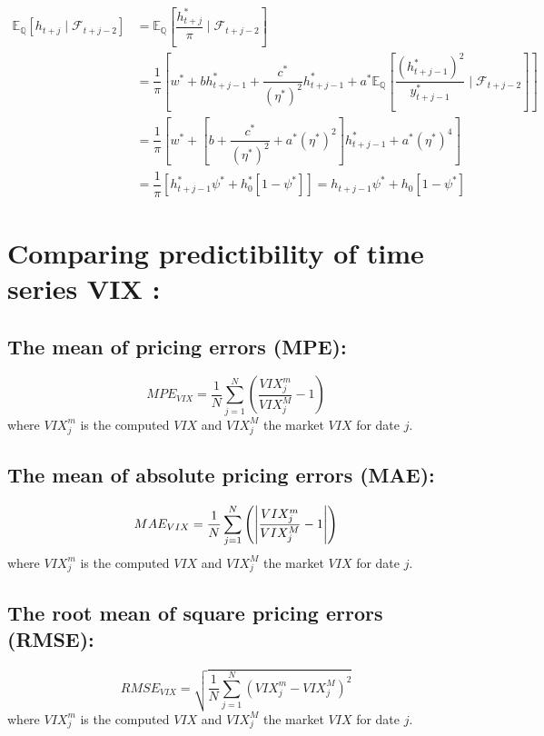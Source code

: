\documentclass[preprint,times,12pt]{elsarticle}
\DeclarePairedDelimiter\abs{\lvert}{\rvert}
\begin{document}
\begin{align*}
\mathbb{E}_\mathbb{Q}\left[ h_{t+j} \mid \mathcal{F}_{t+j-2}\right] &=\mathbb{E}_\mathbb{Q}\left[ \dfrac{h^{*}_{t+j}}{\pi} \mid \mathcal{F}_{t+j-2}\right]\\ 
 &=\dfrac{1}{\pi}\left[ w^{*} +b h^*_{t+j-1}+\dfrac{c^{*}}{(\eta^{*})^{2}} h^{*}_{t+j-1}+a^{*}\mathbb{E}_\mathbb{Q}\left[\dfrac{(h^*_{t+j-1})^{2}}{y^{*}_{t+j-1}} \mid \mathcal{F}_{t+j-2} \right]\right] \\
  &= \dfrac{1}{\pi}\left[w^{*} +\left[b +\dfrac{c^{*}}{\left( \eta^{*}\right) ^{2}} + a^{*}  \left(\eta^{*}\right)^{2}\right] h^{*}_{t+j-1} + a^{*} \left( \eta^{*}\right)^4\right] \\
  &= \dfrac{1}{\pi}\left[h^*_{t+j-1} \psi^{*}  + h^{*}_{0}\left[1-\psi^{*} \right]\right] = h_{t+j-1} \psi^{*}  + h_{0}\left[1-\psi^{*} \right] 
\end{align*}





\section{Comparing predictibility of time series VIX :}
\subsection{The mean of pricing errors (MPE):}
\begin{equation*}
MPE_{VIX}=\dfrac{1}{N}\sum^{N}_{j=1}\left(\dfrac{VIX^{m}_{j}}{VIX^{M}_{j}}-1\right) 
\end{equation*}
where $ VIX^{m}_{j} $ is the computed $ VIX $ and  $VIX^{M}_{j}$ the market $ VIX $ for date $ j $.

\subsection{The mean of absolute pricing errors (MAE):}
\begin{equation*}
MAE_{VIX}=\dfrac{1}{N}\sum^{N}_{j=1}\left(\abs*{\dfrac{VIX^{m}_{j}}{VIX^{M}_{j}}-1}\right) 
\end{equation*}
where $ VIX^{m}_{j} $ is the computed $ VIX $ and  $VIX^{M}_{j}$ the market $ VIX $ for date $ j $.
\subsection{The root mean of square pricing errors (RMSE):}
\begin{equation*}
RMSE_{VIX}=\sqrt{\dfrac{1}{N}\sum^{N}_{j=1}\left( VIX^{m}_{j}-VIX^{M}_{j} \right)^{2}} 
\end{equation*}
where $ VIX^{m}_{j} $ is the computed $ VIX $ and  $VIX^{M}_{j}$ the market $ VIX $ for date $ j $.
\end{document}
